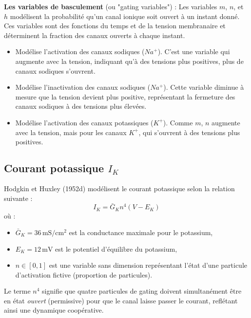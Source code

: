 \documentclass[10pt,french]{beamer}
\begin{document}
	\begin{frame}
		\textbf{Les variables de basculement} (ou "gating variables") : 
		Les variables $m$, $n$, et $h$ modélisent la probabilité qu'un canal ionique soit ouvert à un instant donné. Ces variables sont des fonctions du temps et de la tension membranaire et déterminent la fraction des canaux ouverts à chaque instant.
		\begin{itemize}
			\item[$m$ :] Modélise l'activation des canaux sodiques ($Na^+$). C'est une variable qui augmente avec la tension, indiquant qu'à des tensions plus positives, plus de canaux sodiques s'ouvrent.
			\item[$h$ :] Modélise l'inactivation des canaux sodiques ($Na^+$). Cette variable diminue à mesure que la tension devient plus positive, représentant la fermeture des canaux sodiques à des tensions plus élevées.
			\item[$n$ :] Modélise l'activation des canaux potassiques ($K^+$). Comme $m$, $n$ augmente avec la tension, mais pour les canaux $K^+$, qui s'ouvrent à des tensions plus positives.
		\end{itemize}
	\end{frame}
	\subsection{Courant potassique $I_K$}
	\begin{frame}
		Hodgkin et Huxley (1952d) modélisent le courant potassique selon la relation suivante :
		\begin{equation}
			I_K = \bar{G}_K n^4 (V - E_K)
			\label{eq:1}
		\end{equation}
		où :
		\begin{itemize}
			\item $\bar{G}_K = 36 \, \text{mS}/\text{cm}^2$ est la conductance maximale pour le potassium,
			\item $E_K = 12 \, \text{mV}$ est le potentiel d’équilibre du potassium,
			\item $n \in [0,1]$ est une variable sans dimension représentant l’état d’une particule d’activation fictive (proportion de particules).
		\end{itemize}
		Le terme $n^4$ signifie que quatre particules de gating doivent simultanément être en état \textit{ouvert} (permissive) pour que le canal laisse passer le courant, reflétant ainsi une dynamique coopérative.
	\end{frame}
	
\end{document}
